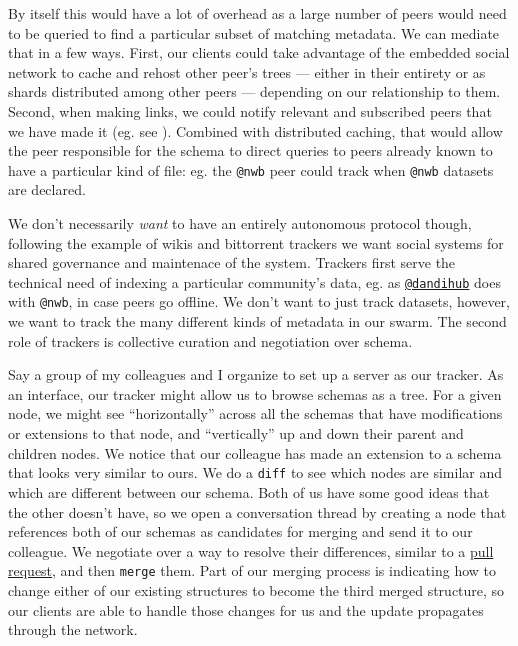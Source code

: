 By itself this would have a lot of overhead as a large number of peers
would need to be queried to find a particular subset of matching
metadata. We can mediate that in a few ways. First, our clients could
take advantage of the embedded social network to cache and rehost other
peer's trees --- either in their entirety or as shards distributed among
other peers --- depending on our relationship to them. Second, when
making links, we could notify relevant and subscribed peers that we have
made it (eg. see \citep{capadisliLinkedDataNotifications2017} ).
Combined with distributed caching, that would allow the peer responsible
for the schema to direct queries to peers already known to have a
particular kind of file: eg. the \texttt{@nwb} peer could track when
\texttt{@nwb} datasets are declared.

We don't necessarily \emph{want} to have an entirely autonomous protocol
though, following the example of wikis and bittorrent trackers we want
social systems for shared governance and maintenace of the system.
Trackers first serve the technical need of indexing a particular
community's data, eg. as
\href{https://hub.dandiarchive.org}{\texttt{@dandihub}} does with
\texttt{@nwb}, in case peers go offline. We don't want to just track
datasets, however, we want to track the many different kinds of metadata
in our swarm. The second role of trackers is collective curation and
negotiation over schema.

Say a group of my colleagues and I organize to set up a server as our
tracker. As an interface, our tracker might allow us to browse schemas
as a tree. For a given node, we might see ``horizontally'' across all
the schemas that have modifications or extensions to that node, and
``vertically'' up and down their parent and children nodes. We notice
that our colleague has made an extension to a schema that looks very
similar to ours. We do a \texttt{diff} to see which nodes are similar
and which are different between our schema. Both of us have some good
ideas that the other doesn't have, so we open a conversation thread by
creating a node that references both of our schemas as candidates for
merging and send it to our colleague. We negotiate over a way to resolve
their differences, similar to a
\href{https://docs.github.com/en/pull-requests/collaborating-with-pull-requests/proposing-changes-to-your-work-with-pull-requests/about-pull-requests}{pull
request}, and then \texttt{merge} them. Part of our merging process is
indicating how to change either of our existing structures to become the
third merged structure, so our clients are able to handle those changes
for us and the update propagates through the network.

